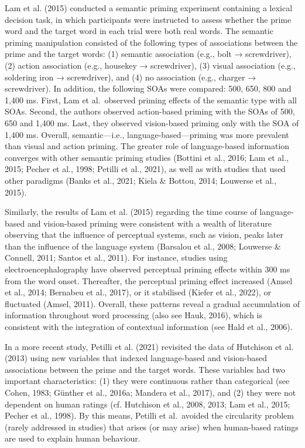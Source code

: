 \documentclass[
  12pt,
  man,floatsintext]{apa7}
\begin{document}
Lam et al. (2015) conducted a semantic priming experiment containing a lexical decision task, in which participants were instructed to assess whether the prime word and the target word in each trial were both real words. The semantic priming manipulation consisted of the following types of associations between the prime and the target words: (1) semantic association (e.g., bolt → screwdriver), (2) action association (e.g., housekey → screwdriver), (3) visual association (e.g., soldering iron → screwdriver), and (4) no association (e.g., charger → screwdriver). In addition, the following SOAs were compared: 500, 650, 800 and 1,400 ms. First, Lam et al.~observed priming effects of the semantic type with all SOAs. Second, the authors observed action-based priming with the SOAs of 500, 650 and 1,400 ms. Last, they observed vision-based priming only with the SOA of 1,400 ms. Overall, semantic---i.e., language-based---priming was more prevalent than visual and action priming. The greater role of language-based information converges with other semantic priming studies (Bottini et al., 2016; Lam et al., 2015; Pecher et al., 1998; Petilli et al., 2021), as well as with studies that used other paradigms (Banks et al., 2021; Kiela \& Bottou, 2014; Louwerse et al., 2015).

Similarly, the results of Lam et al. (2015) regarding the time course of language-based and vision-based priming were consistent with a wealth of literature observing that the influence of perceptual systems, such as vision, peaks later than the influence of the language system (Barsalou et al., 2008; Louwerse \& Connell, 2011; Santos et al., 2011). For instance, studies using electroencephalography have observed perceptual priming effects within 300 ms from the word onset. Thereafter, the perceptual priming effect increased (Amsel et al., 2014; Bernabeu et al., 2017), or it stabilised (Kiefer et al., 2022), or fluctuated (Amsel, 2011). Overall, these patterns reveal a gradual accumulation of information throughout word processing (also see Hauk, 2016), which is consistent with the integration of contextual information (see Hald et al., 2006).

In a more recent study, Petilli et al. (2021) revisited the data of Hutchison et al. (2013) using new variables that indexed language-based and vision-based associations between the prime and the target words. These variables had two important characteristics: (1) they were continuous rather than categorical (see Cohen, 1983; Günther et al., 2016a; Mandera et al., 2017), and (2) they were not dependent on human ratings (cf. Hutchison et al., 2008, 2013; Lam et al., 2015; Pecher et al., 1998). By this means, Petilli et al.~avoided the circularity problem (rarely addressed in studies) that arises (or may arise) when human-based ratings are used to explain human behaviour.
\end{document}
